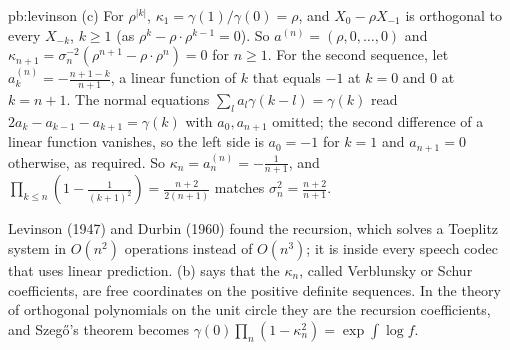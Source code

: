 \begin{solution}{pb:levinson}
(c) For $\rho^{|k|}$, $\kappa_1=\gamma(1)/\gamma(0)=\rho$, and $X_0-\rho X_{-1}$ is orthogonal to every $X_{-k}$, $k\ge1$ (as $\rho^k-\rho\cdot\rho^{k-1}=0$). So $a^{(n)}=(\rho,0,\dots,0)$ and
$\kappa_{n+1}=\sigma_n^{-2}(\rho^{n+1}-\rho\cdot\rho^n)=0$ for $n\ge1$. For the second sequence, let $a^{(n)}_k=-\frac{n+1-k}{n+1}$, a linear function of $k$ that equals $-1$ at $k=0$ and $0$ at $k=n+1$. The
normal equations $\sum_la_l\gamma(k-l)=\gamma(k)$ read $2a_k-a_{k-1}-a_{k+1}=\gamma(k)$ with $a_0,a_{n+1}$ omitted; the second difference of a linear function vanishes, so the left side is $a_0=-1$ for
$k=1$ and $a_{n+1}=0$ otherwise, as required. So $\kappa_n=a^{(n)}_n=-\frac1{n+1}$, and $\prod_{k\le n}(1-\frac1{(k+1)^2})=\frac{n+2}{2(n+1)}$ matches $\sigma_n^2=\frac{n+2}{n+1}$.

\leads Levinson (1947) and Durbin (1960) found the recursion, which solves a Toeplitz system in $O(n^2)$ operations instead of $O(n^3)$; it is inside every speech codec that uses linear
prediction. (b) says that the $\kappa_n$, called Verblunsky or Schur coefficients, are free coordinates on the positive definite sequences. In the theory of orthogonal polynomials on the unit
circle they are the recursion coefficients, and Szegő's theorem becomes $\gamma(0)\prod_n(1-\kappa_n^2)=\exp\int\log f$.
\end{solution}

